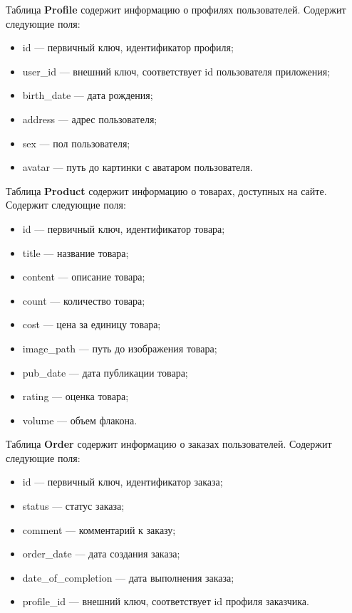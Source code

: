 Таблица \textbf{Profile} содержит информацию о профилях пользователей. Содержит следующие поля:

\begin{itemize}
	\item id --- первичный ключ, идентификатор профиля;
	\item user\_id --- внешний ключ, соответствует id пользователя приложения;
	\item birth\_date --- дата рождения;
	\item address --- адрес пользователя;
	\item sex --- пол пользователя;
	\item avatar --- путь до картинки с аватаром пользователя.
\end{itemize}

Таблица \textbf{Product} содержит информацию о товарах, доступных на сайте. Содержит следующие поля:

\begin{itemize}
	\item id --- первичный ключ, идентификатор товара;
	\item title --- название товара;
	\item content --- описание товара;
	\item count --- количество товара;
	\item cost --- цена за единицу товара;
	\item image\_path --- путь до изображения товара;
	\item pub\_date --- дата публикации товара;
	\item rating --- оценка товара;
	\item volume --- объем флакона.
\end{itemize}

Таблица \textbf{Order} содержит информацию о заказах пользователей. Содержит следующие поля:

\begin{itemize}
	\item id --- первичный ключ, идентификатор заказа;
	\item status --- статус заказа;
	\item comment --- комментарий к заказу;
	\item order\_date --- дата создания заказа;
	\item date\_of\_completion --- дата выполнения заказа;
	\item profile\_id --- внешний ключ, соответствует id профиля заказчика.
\end{itemize}

